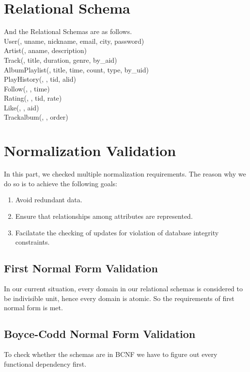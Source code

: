 \documentclass[letter, 12pt]{report}
\begin{document}
	\section{Relational Schema}
	And the Relational Schemas are as follows.\\
	User(\underline{}, uname, nickname, email, city, password)\\
	Artist(\underline{}, aname, description)\\
	Track(\underline{}, title, duration, genre, by\_aid)\\
	AlbumPlaylist(\underline{}, title, time, count, type, by\_uid)\\
	PlayHistory(\underline{}, \underline{}, tid, alid)\\
	Follow(\underline{}, \underline{}, time)\\
	Rating(\underline{}, \underline{}, tid, rate)\\
	Like(\underline{}, \underline{}, aid)\\
	Trackalbum(\underline{}, \underline{}, order)\\
	
	
	\section{Normalization Validation}
	In this part, we checked multiple normalization requirements. The reason why we do so is to achieve the following goals:
	\begin{enumerate}
		\item 
		Avoid redundant data.
		\item 
		Ensure that relationships among attributes are represented.
		\item 
		Facilatate the checking of updates for violation of database integrity constraints.
	\end{enumerate}
	\subsection{First Normal Form Validation}
	In our current situation, every domain in our relational schemas is considered to be indivisible unit, hence every domain is atomic. So the requirements of first normal form is met.
	\subsection{Boyce-Codd Normal Form Validation}
	To check whether the schemas are in BCNF we have to figure out every functional dependency first.
\end{document}
